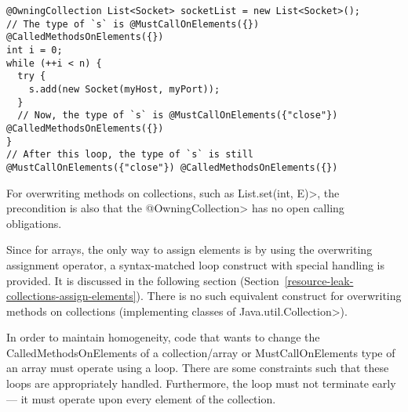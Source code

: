 \begin{verbatim}
@OwningCollection List<Socket> socketList = new List<Socket>();
// The type of `s` is @MustCallOnElements({}) @CalledMethodsOnElements({})
int i = 0;
while (++i < n) {
  try {
    s.add(new Socket(myHost, myPort));
  }
  // Now, the type of `s` is @MustCallOnElements({"close"}) @CalledMethodsOnElements({})
}
// After this loop, the type of `s` is still @MustCallOnElements({"close"}) @CalledMethodsOnElements({})
\end{verbatim}

For overwriting methods on collections, such as \<List.set(int, E)>, the precondition is also that the \<@OwningCollection> has no open calling obligations.

Since for arrays, the only way to assign elements is by using the overwriting assignment operator, a syntax-matched loop construct with special handling is provided. It is discussed in the following section (Section~\ref{resource-leak-collections-assign-elements}). There is no such equivalent construct for overwriting methods on collections (implementing classes of \<Java.util.Collection>).


In order to maintain homogeneity, code that wants to change the CalledMethodsOnElements of a collection/array or MustCallOnElements type of an array must operate using a loop. There are some constraints such that these loops are appropriately handled. Furthermore, the loop must not terminate early --- it must
operate upon every element of the collection.

